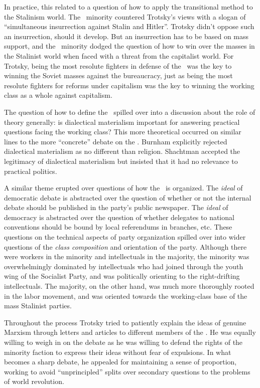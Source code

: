 In practice, this related to a question of how to apply the transitional method to the Stalinism world. The \SWP\ minority countered Trotsky’s views with a slogan of “simultaneous insurrection against Stalin and Hitler”. Trotsky didn’t oppose such an insurrection, should it develop. But an insurrection has to be based on mass support, and the \SWP\ minority dodged the question of how to win over the masses in the Stalinist world when faced with a threat from the capitalist world. For Trotsky, being the most resolute fighters in defense of the \USSR\ was the key to winning the Soviet masses against the bureaucracy, just as being the most resolute fighters for reforms under capitalism was the key to winning the working class as a whole against capitalism.

The question of how to define the \USSR\ spilled over into a discussion about the role of theory generally: is dialectical materialism important for answering practical questions facing the working class? This more theoretical occurred on similar lines to the more “concrete” debate on the \USSR. Burnham explicitly rejected dialectical materialism as no different than religion. Shachtman accepted the legitimacy of dialectical materialism but insisted that it had no relevance to practical politics.
\nowidow

A similar theme erupted over questions of how the \SWP\ is organized. The \emph{ideal} of democratic debate is abstracted over the question of whether or not the internal debate should be published in the party’s public newspaper. The \emph{ideal} of democracy is abstracted over the question of whether delegates to national conventions should be bound by local referendums in branches, etc. These questions on the technical aspects of party organization spilled over into wider questions of the \emph{class composition} and orientation of the party. Although there were workers in the minority and intellectuals in the majority, the minority was overwhelmingly dominated by intellectuals who had joined through the youth wing of the Socialist Party, and was politically orienting to the right-drifting intellectuals. The majority, on the other hand, was much more thoroughly rooted in the labor movement, and was oriented towards the working-class base of the mass Stalinist parties.

Throughout the process Trotsky tried to patiently explain the ideas of genuine Marxism through letters and articles to different members of the \SWP. He was equally willing to weigh in on the debate as he was willing to defend the rights of the minority faction to express their ideas without fear of expulsions. In what becomes a sharp debate, he appealed for maintaining a sense of proportion, working to avoid “unprincipled” splits over secondary questions to the problems of world revolution.

